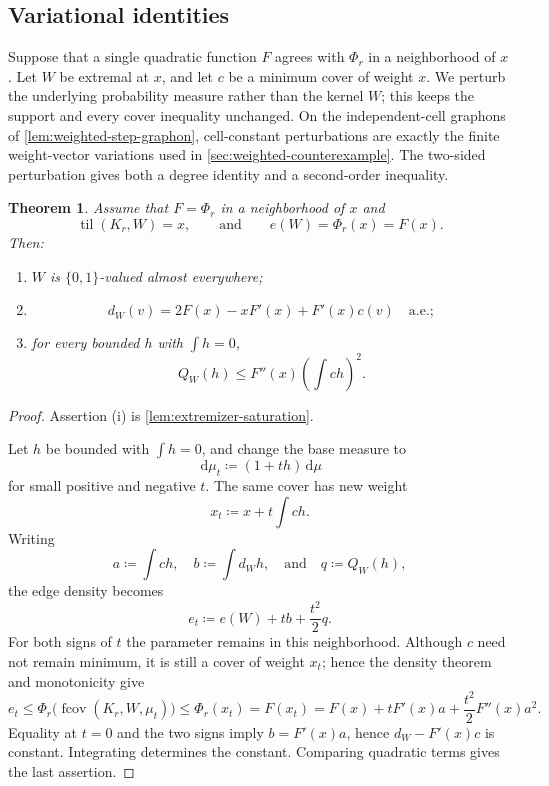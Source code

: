 \documentclass[10pt]{article}
\numberwithin{equation}{section}
\newtheorem{theorem}{Theorem}[section]
\newcommand{\til}{\operatorname{til}}
\newcommand{\fcov}{\operatorname{fcov}}
\newcommand{\dd}{\,\mathrm d}
\begin{document}
\subsection{Variational identities}\label{sec:variation}

Suppose that a single quadratic function $F$ agrees with $\Phi_r$ in a neighborhood of $x$.  Let $W$ be extremal at $x$, and let $c$ be a minimum cover of weight $x$.  We perturb the underlying probability measure rather than the kernel $W$; this keeps the support and every cover inequality unchanged.  On the independent-cell graphons of \cref{lem:weighted-step-graphon}, cell-constant perturbations are exactly the finite weight-vector variations used in \cref{sec:weighted-counterexample}.  The two-sided perturbation gives both a degree identity and a second-order inequality.

\begin{theorem}\label{thm:variation}
Assume that $F=\Phi_r$ in a neighborhood of $x$ and
\[
 \til(K_r,W)=x,
 \qquad\text{and}\qquad
 e(W)=\Phi_r(x)=F(x).
\]
Then:
\begin{enumerate}[label=\textup{(\roman*)}]
\item $W$ is $\{0,1\}$-valued almost everywhere;
\item
\[
 d_W(v)=2F(x)-xF'(x)+F'(x)c(v)
 \quad\text{a.e.};
\]
\item for every bounded $h$ with $\int h=0$,
\[
 Q_W(h)\le F''(x)\left(\int ch\right)^2.
\]
\end{enumerate}
\end{theorem}

\begin{proof}
Assertion \textup{(i)} is \cref{lem:extremizer-saturation}.

Let $h$ be bounded with $\int h=0$, and change the base measure to
\[
 \dd\mu_t\coloneqq(1+th)\dd\mu
\]
for small positive and negative $t$.  The same cover has new weight
\[
 x_t\coloneqq x+t\int ch.
\]
Writing
\[
 a\coloneqq\int ch,
 \quad b\coloneqq\int d_Wh,
 \quad\text{and}\quad q\coloneqq Q_W(h),
\]
the edge density becomes
\[
 e_t\coloneqq e(W)+tb+\frac{t^2}{2}q.
\]
For both signs of $t$ the parameter remains in this neighborhood.  Although $c$ need not remain minimum, it is still a cover of weight $x_t$; hence the density theorem and monotonicity give
\[
 e_t\le \Phi_r\bigl(\fcov(K_r,W,\mu_t)\bigr)\le \Phi_r(x_t)=F(x_t)
 =F(x)+tF'(x)a+\frac{t^2}{2}F''(x)a^2.
\]
Equality at $t=0$ and the two signs imply $b=F'(x)a$, hence $d_W-F'(x)c$ is constant.  Integrating determines the constant.  Comparing quadratic terms gives the last assertion.
\end{proof}
\end{document}
